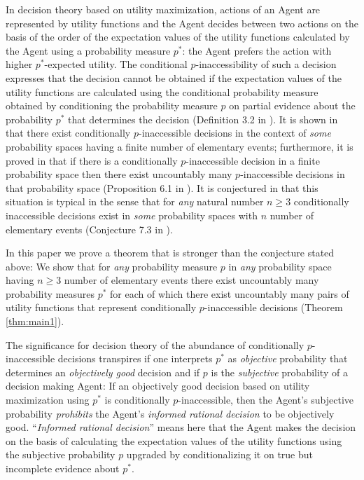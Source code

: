 \documentclass[10pt, letterpaper]{article}%
\theoremstyle{definition}
\newcommand{\1}{\mathbf 1}
\begin{document}
In decision theory based on utility maximization, actions of an Agent are represented by utility functions and the Agent decides between two actions on the basis of the order of the expectation values of the utility functions calculated by the Agent using a probability measure $p^*$: the Agent prefers the action with higher $p^*$-expected utility. The conditional $p$-inaccessibility of such a decision expresses that the decision cannot be obtained if the expectation values of the utility functions are calculated using the conditional probability measure obtained by conditioning the probability measure $p$ on partial evidence about the probability $p^*$ that determines the decision (Definition 3.2 in \cite{Redei-Jing2026}). It is shown in \cite{Redei-Jing2026} that there exist conditionally $p$-inaccessible decisions in the context of \emph{some} probability spaces having a finite number of elementary events; furthermore, it is proved in \cite{Redei-Jing2026} that if there is a conditionally $p$-inaccessible decision in a finite probability space then there exist uncountably many $p$-inaccessible decisions in that probability space (Proposition 6.1 in \cite{Redei-Jing2026}). It is conjectured in \cite{Redei-Jing2026} that this situation is typical in the sense that for \emph{any} natural number $n\geq 3$ conditionally inaccessible decisions exist in \emph{some} probability spaces with $n$ number of elementary events (Conjecture 7.3 in \cite{Redei-Jing2026}).

In this paper we prove a theorem that is stronger than the conjecture stated above: We show that for \emph{any} probability measure $p$ in \emph{any} probability space having $n\geq 3$ number of elementary events there exist uncountably many probability measures $p^*$ for each of which there exist uncountably many pairs of utility functions that represent conditionally $p$-inaccessible decisions (Theorem \ref{thm:main1}). 

The significance for decision theory of the abundance of conditionally $p$-inaccessible decisions transpires if one interprets $p^*$ as \emph{objective} probability that determines an \emph{objectively good} decision and if $p$ is the \emph{subjective} probability of a decision making Agent: If an objectively good decision based on utility maximization using $p^*$ is conditionally $p$-inaccessible, then the Agent's subjective probability \emph{prohibits} the Agent's \emph{informed rational decision} to be objectively good. ``\emph{Informed rational decision}'' means here that the Agent makes the decision on the basis of calculating the expectation values of the utility functions using the subjective probability $p$ upgraded by conditionalizing it on true but incomplete evidence about $p^*$. 
\end{document}
